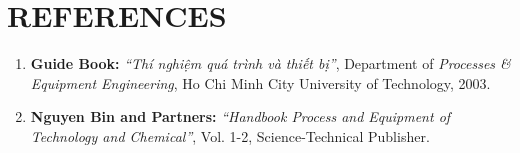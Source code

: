 \section{REFERENCES}\label{references}

\begin{enumerate}
    \item \textbf{Guide Book:} \emph{``Thí nghiệm quá trình và thiết bị''}, Department of \emph{Processes \& Equipment Engineering}, Ho Chi Minh City University of Technology, 2003.
    \item \textbf{Nguyen Bin and Partners:} \emph{``Handbook Process and Equipment of Technology and Chemical''}, Vol. 1-2, Science-Technical Publisher.
\end{enumerate}
